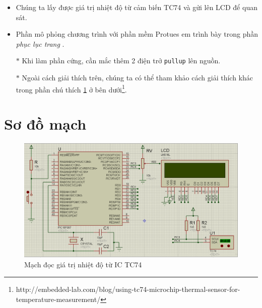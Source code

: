 \begin{itemize}
\begin{itemize}
\item Thiết bị chủ gửi địa chỉ của thiết bị tớ cùng với bit 1 (lấy địa chỉ thiết bị I2C thêm vào bit 1: \verb|1001000 1 = 0x91|), dùng lệnh: \verb|i2c_write(0x91);|
\item Phần còn lại là đọc giá trị nhiệt độ từ thiết bị tớ, thiết bị chủ gửi xung \verb|Not-ACK| dùng lệnh: \verb|i2c_read(0);| (giá trị là số nguyên 8 bit).
\item Tạo điều kiện \verb|Stop|: \verb|i2c_stop();| để kết thúc quá trình giao tiếp.
\item Để giao tiếp được nhiều lần, ta thực hiện vòng lặp \verb|while| để lặp lại quá trình này (từ lệnh \verb|i2c_start();| đến \verb|i2c_stop();|).
\end{itemize}
\item Chúng ta lấy được giá trị nhiệt độ từ cảm biến TC74 và gửi lên LCD để quan sát.
\item Phần mô phỏng chương trình với phần mềm Protues em trình bày trong phần \textit{phục lục trang \pageref{def:TC74}}.
\item[$\ast$] Khi làm phần cứng, cần mắc thêm 2 điện trở \verb|pullup| lên nguồn.
\item[$\ast$] Ngoài cách giải thích trên, chúng ta có thể tham khảo cách giải thích khác trong phần chú thích \ref{note:TC74} ở bên dưới\footnote{http://embedded-lab.com/blog/using-tc74-microchip-thermal-sensor-for-temperature-measurement/\label{note:TC74}}.
\end{itemize}
\section*{Sơ đồ mạch}
\begin{figure}[!h]
\begin{center}
\includegraphics[scale=0.45]{bai-6/image/BAI-6-1}
\end{center}
\caption{Mạch đọc giá trị nhiệt độ từ IC TC74}
\end{figure}
\newpage
